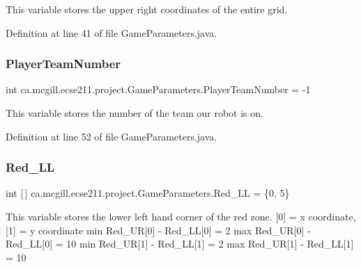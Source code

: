 This variable stores the upper right coordinates of the entire grid. 

Definition at line 41 of file Game\+Parameters.\+java.

\mbox{\label{classca_1_1mcgill_1_1ecse211_1_1project_1_1_game_parameters_a15bc3c24f73d1ad29b6fe7fd9e1ef0e6}} 
\subsubsection{\texorpdfstring{Player\+Team\+Number}{PlayerTeamNumber}}
{\footnotesize\ttfamily int ca.\+mcgill.\+ecse211.\+project.\+Game\+Parameters.\+Player\+Team\+Number = -\/1\hspace{0.3cm}{\ttfamily [static]}}

This variable stores the number of the team our robot is on. 

Definition at line 52 of file Game\+Parameters.\+java.

\mbox{\label{classca_1_1mcgill_1_1ecse211_1_1project_1_1_game_parameters_ae3eb3c87467d3a7760cd619a96379a9e}} 
\subsubsection{\texorpdfstring{Red\+\_\+\+LL}{Red\_LL}}
{\footnotesize\ttfamily int \mbox{[}$\,$\mbox{]} ca.\+mcgill.\+ecse211.\+project.\+Game\+Parameters.\+Red\+\_\+\+LL = \{0, 5\}\hspace{0.3cm}{\ttfamily [static]}}

This variable stores the lower left hand corner of the red zone. \mbox{[}0\mbox{]} = x coordinate, \mbox{[}1\mbox{]} = y coordinate min Red\+\_\+\+UR\mbox{[}0\mbox{]} -\/ Red\+\_\+\+LL\mbox{[}0\mbox{]} = 2 max Red\+\_\+\+UR\mbox{[}0\mbox{]} -\/ Red\+\_\+\+LL\mbox{[}0\mbox{]} = 10 min Red\+\_\+\+UR\mbox{[}1\mbox{]} -\/ Red\+\_\+\+LL\mbox{[}1\mbox{]} = 2 max Red\+\_\+\+UR\mbox{[}1\mbox{]} -\/ Red\+\_\+\+LL\mbox{[}1\mbox{]} = 10 


